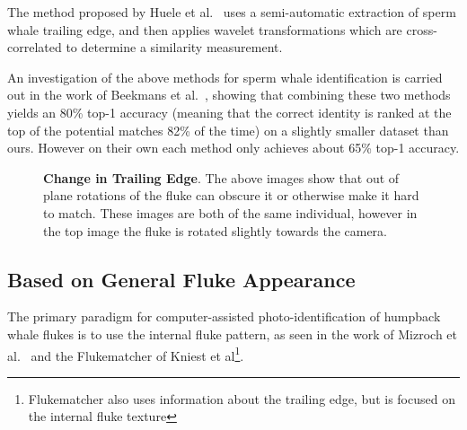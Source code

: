 The method proposed by Huele et al.\ \cite{huele2000finding} uses a semi-automatic extraction of sperm whale trailing edge, and then applies wavelet transformations which are cross-correlated to determine a similarity measurement.

An investigation of the above methods for sperm whale identification is carried out in the work of Beekmans et al.\ \cite{beekmans2005comparison}, showing that combining these two methods yields an 80\% top-1 accuracy (meaning that the correct identity is ranked at the top of the potential matches 82\% of the time) on a slightly smaller dataset than ours.
However on their own each method only achieves about 65\% top-1 accuracy.

\begin{figure}[t]%
\centering
{}
\newline
{}
\caption{\textbf{Change in Trailing Edge}. The above images show that out of plane rotations of the fluke can obscure it or otherwise make it hard to match. These images are both of the same individual, however in the top image the fluke is rotated slightly towards the camera.}
\label{fig:unclear_te}
\end{figure}

\subsection{Based on General Fluke Appearance}


The primary paradigm for computer-assisted photo-identification of humpback whale flukes is to use the internal fluke pattern, as seen in the work of Mizroch et al.\ \cite{mizroch1990computer} and the Flukematcher \cite{kniest2010fluke} of Kniest et al\footnote{Flukematcher also uses information about the trailing edge, but is focused on the internal fluke texture}. 


